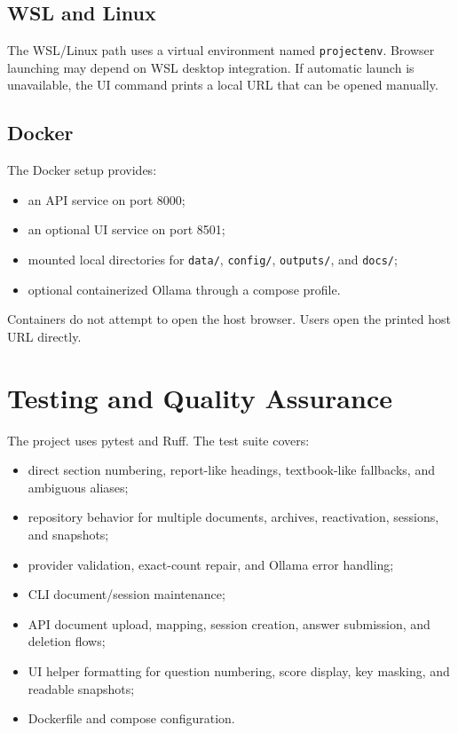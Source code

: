 \documentclass[11pt]{article}
\begin{document}
\subsection{WSL and Linux}

The WSL/Linux path uses a virtual environment named \texttt{projectenv}. Browser launching may depend on WSL desktop integration. If automatic launch is unavailable, the UI command prints a local URL that can be opened manually.

\subsection{Docker}

The Docker setup provides:

\begin{itemize}
  \item an API service on port 8000;
  \item an optional UI service on port 8501;
  \item mounted local directories for \texttt{data/}, \texttt{config/}, \texttt{outputs/}, and \texttt{docs/};
  \item optional containerized Ollama through a compose profile.
\end{itemize}

Containers do not attempt to open the host browser. Users open the printed host URL directly.

\section{Testing and Quality Assurance}

The project uses pytest and Ruff. The test suite covers:

\begin{itemize}
  \item direct section numbering, report-like headings, textbook-like fallbacks, and ambiguous aliases;
  \item repository behavior for multiple documents, archives, reactivation, sessions, and snapshots;
  \item provider validation, exact-count repair, and Ollama error handling;
  \item CLI document/session maintenance;
  \item API document upload, mapping, session creation, answer submission, and deletion flows;
  \item UI helper formatting for question numbering, score display, key masking, and readable snapshots;
  \item Dockerfile and compose configuration.
\end{itemize}
\end{document}
